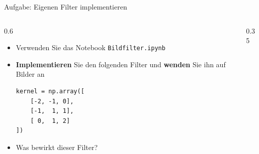 {\begin{frame}[fragile]{Aufgabe: Eigenen Filter implementieren}
\begin{columns}
\begin{column}{0.6\textwidth}
\begin{itemize}
    \item Verwenden Sie das Notebook \texttt{Bildfilter.ipynb}
    \item \textbf{Implementieren} Sie den folgenden Filter und \textbf{wenden} Sie ihn auf Bilder an
\begin{verbatim}
kernel = np.array([
    [-2, -1, 0],
    [-1,  1, 1],
    [ 0,  1, 2]
])
\end{verbatim}
\item Was bewirkt dieser Filter?
\end{itemize}
\end{column}
\begin{column}{0.35\textwidth}
\centering
{}
\end{column}
\end{columns}
\end{frame}


}
